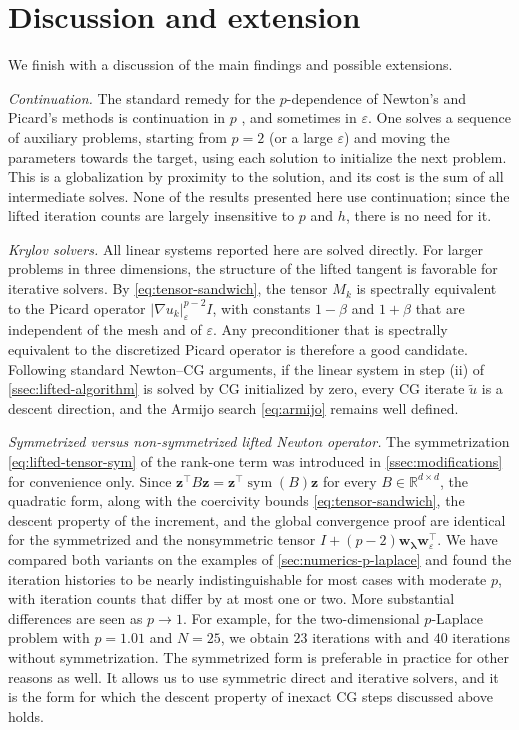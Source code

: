\documentclass[11pt,pdflatex,sn-mathphys-num]{sn-jnl}
\theoremstyle{thmstyleone}%
\theoremstyle{thmstyletwo}%
\theoremstyle{thmstylethree}%
\newcommand{\bs}[1]{\ensuremath{\boldsymbol{#1}}}
\DeclareMathOperator{\sym}{sym}
\begin{document}
\section{Discussion and extension}
We finish with a discussion of the main findings and possible extensions.

\noindent
\emph{Continuation.}
The standard remedy for the $p$-dependence of Newton's and Picard's
methods is continuation in $p$ \cite{HuangLiLiu07}, and sometimes in
$\varepsilon$. One solves a sequence of auxiliary problems, starting from
$p=2$ (or a large $\varepsilon$) and moving the parameters 
towards the target, using each solution to initialize the next problem.
This is a globalization by proximity to the solution, and its cost is
the sum of all intermediate solves.  None of the results presented here use continuation;
since the lifted iteration counts are largely insensitive to $p$ and $h$, there is no need for it.

\noindent
\emph{Krylov solvers.}
All linear systems reported here are solved directly.  For larger
problems in three dimensions, the structure of the
lifted tangent is favorable for iterative solvers.  By
\eqref{eq:tensor-sandwich}, the tensor $M_k$ is spectrally equivalent
to the Picard operator $|\nabla u_k|_\varepsilon^{p-2}I$, with
constants $1-\beta$ and $1+\beta$ that are independent of the mesh and of
$\varepsilon$. Any preconditioner that is spectrally equivalent to the discretized Picard operator is therefore a good candidate.
Following standard Newton--CG arguments, if the linear system in step (ii) of
\cref{ssec:lifted-algorithm} is solved by CG initialized by zero, every
CG iterate $\tilde u$ is a descent direction, and the Armijo
search \eqref{eq:armijo} remains well defined.

\noindent
\emph{Symmetrized versus non-symmetrized lifted Newton operator.}
The symmetrization \eqref{eq:lifted-tensor-sym} of the rank-one term
was introduced in \cref{ssec:modifications} for convenience only.  Since
$\bs z^\top B\bs z=\bs z^\top\sym(B)\bs z$ for every $B\in\mathbb
R^{d\times d}$, the quadratic form, along with the coercivity bounds
\eqref{eq:tensor-sandwich}, the descent property of the increment, and
the global convergence proof are identical for the symmetrized and the
nonsymmetric tensor $I+(p-2)\bs w_{\bs\lambda}\bs w_\varepsilon^\top$.
We have
compared both variants on the examples of \cref{sec:numerics-p-laplace}
and found the iteration histories to be nearly indistinguishable for most cases with moderate $p$, with
iteration counts that differ by at most one or two. More substantial differences are seen as $p\to 1$. For example, for the two-dimensional $p$-Laplace problem with $p=1.01$ and $N=25$, we obtain $23$ iterations with and $40$ iterations without symmetrization. The symmetrized
form is preferable in practice for other reasons as well. It allows us to use symmetric direct and iterative solvers,
and it is the form for which the descent
property of inexact CG steps discussed above holds.
\end{document}
